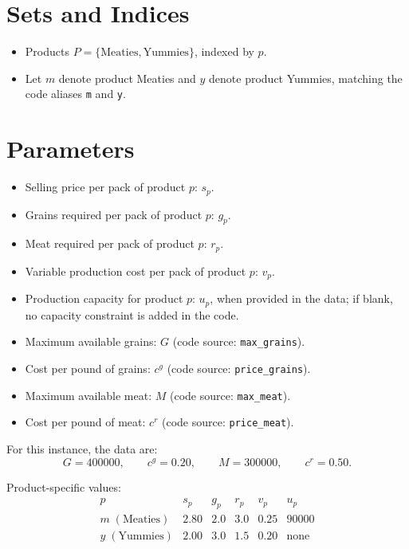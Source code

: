 \section*{Sets and Indices}

\begin{itemize}
    \item Products \(P = \{\text{Meaties}, \text{Yummies}\}\), indexed by \(p\).
    \item Let \(m\) denote product Meaties and \(y\) denote product Yummies, matching the code aliases \texttt{m} and \texttt{y}.
\end{itemize}

\section*{Parameters}

\begin{itemize}
    \item Selling price per pack of product \(p\): \(s_p\).
    \item Grains required per pack of product \(p\): \(g_p\).
    \item Meat required per pack of product \(p\): \(r_p\).
    \item Variable production cost per pack of product \(p\): \(v_p\).
    \item Production capacity for product \(p\): \(u_p\), when provided in the data; if blank, no capacity constraint is added in the code.
    \item Maximum available grains: \(G\) (code source: \texttt{max\_grains}).
    \item Cost per pound of grains: \(c^g\) (code source: \texttt{price\_grains}).
    \item Maximum available meat: \(M\) (code source: \texttt{max\_meat}).
    \item Cost per pound of meat: \(c^r\) (code source: \texttt{price\_meat}).
\end{itemize}

For this instance, the data are:
\[
G = 400000,\qquad c^g = 0.20,\qquad M = 300000,\qquad c^r = 0.50.
\]

Product-specific values:
\[
\begin{array}{c|ccccc}
p & s_p & g_p & r_p & v_p & u_p \\
\hline
m\;(\text{Meaties}) & 2.80 & 2.0 & 3.0 & 0.25 & 90000 \\
y\;(\text{Yummies}) & 2.00 & 3.0 & 1.5 & 0.20 & \text{none}
\end{array}
\]

